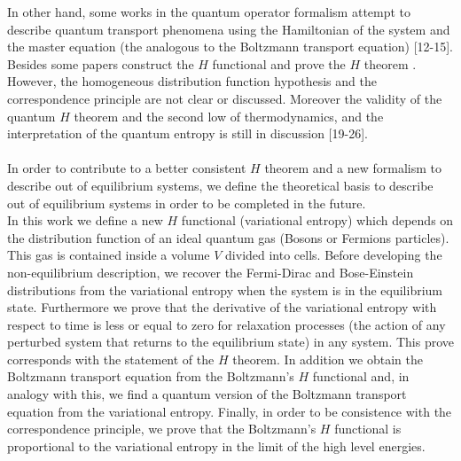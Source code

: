 \documentclass{article}
\begin{document}
{In other hand, some works in the quantum operator formalism attempt to describe quantum transport phenomena using the Hamiltonian of the system and the master equation (the analogous to the Boltzmann transport equation) [12-15]. %
Besides some papers construct the $H$ functional and prove the $H$ theorem \cite{htheorem2, quantum1, quantum2}. However, the homogeneous distribution function hypothesis and the correspondence principle are not clear or discussed. Moreover the validity of the quantum $H$ theorem and the second low of thermodynamics, and the interpretation of the quantum entropy is still in discussion [19-26].\\ %
\\
In order to contribute to a better consistent $H$ theorem and a new formalism to describe out of equilibrium systems, we define the theoretical basis to describe out of equilibrium systems in order to be completed in the future.\\
In this work we define a new $H$ functional (variational entropy) which depends on the distribution function of an ideal quantum gas (Bosons or Fermions particles). This gas is contained inside a volume $V$ divided into cells. Before developing the non-equilibrium description, we recover the Fermi-Dirac and Bose-Einstein distributions from the variational entropy when the system is in the equilibrium state. Furthermore we prove that the derivative of the variational entropy with respect to time is less or equal to zero for relaxation processes (the action of any perturbed system that returns to the equilibrium state) in any system. This prove corresponds with the statement of the $H$ theorem. In addition we obtain the Boltzmann transport equation from the Boltzmann's $H$ functional and, in analogy with this, we find a quantum version of the Boltzmann transport equation from the variational entropy. Finally, in order to be consistence with the correspondence principle, we prove that the Boltzmann's $H$ functional is proportional to the variational entropy in the limit of the high level energies.}
\end{document}
